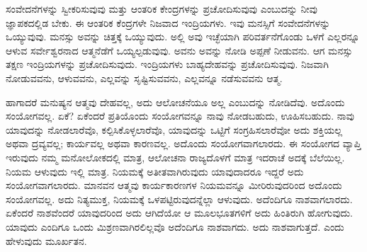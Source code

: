 ಸಂವೇದನೆಗಳನ್ನು ಸ್ವೀಕರಿಸುವುವು ಮತ್ತು ಆಂತರಿಕ ಕೇಂದ್ರಗಳನ್ನು ಪ್ರಚೋದಿಸುವುವು ಎಂಬುದನ್ನು ನೀವು ಜ್ಞಾಪಕದಲ್ಲಿಡ ಬೇಕು. ಈ ಆಂತರಿಕ ಕೆಂದ್ರಗಳೇ ನಿಜವಾದ ಇಂದ್ರಿಯಗಳು. ಇವು ಮನಸ್ಸಿಗೆ ಸಂವೇದನೆಗಳನ್ನು ಒಯ್ಯುವುವು. ಮನಸ್ಸು ಅವನ್ನು ಚಿತ್ತಕ್ಕೆ ಒಯ್ಯುವುದು. ಅಲ್ಲಿ ಅವು ಇಚ್ಛೆಯಾಗಿ ಪರಿವರ್ತನೆಗೊಂಡು ಒಳಗೆ ಎಲ್ಲರನ್ನೂ ಆಳುವ ಸರ್ವೇಶ್ವರನಾದ ಆತ್ಮನೆಡೆಗೆ ಒಯ್ಯಲ್ಪಡುವುವು. ಅವನು ಅವನ್ನು ನೋಡಿ ಅಪ್ಪಣೆ ನೀಡುವನು. ಆಗ ಮನಸ್ಸು ತಕ್ಷಣ ಇಂದ್ರಿಯಗಳನ್ನು ಪ್ರಚೋದಿಸುವುದು. ಇಂದ್ರಿಯಗಳು ಬಾಹ್ಯದೇಹವನ್ನು ಪ್ರಚೋದಿಸುವುವು. ನಿಜವಾಗಿ ನೋಡುವವನು, ಆಳುವವನು, ಎಲ್ಲವನ್ನು ಸೃಷ್ಟಿಸುವವನು, ಎಲ್ಲವನ್ನೂ ನಡೆಸುವವನು ಆತ್ಮ.

ಹಾಗಾದರೆ ಮನುಷ್ಯನ ಆತ್ಮವು ದೇಹವಲ್ಲ, ಅದು ಆಲೋಚನೆಯೂ ಅಲ್ಲ ಎಂಬುದನ್ನು ನೋಡಿದೆವು. ಅದೊಂದು ಸಂಯೋಗವಲ್ಲ. ಏಕೆ? ಏಕೆಂದರೆ ಪ್ರತಿಯೊಂದು ಸಂಯೋಗವನ್ನೂ ನಾವು ನೋಡಬಹುದು, ಊಹಿಸಬಹುದು. ನಾವು ಯಾವುದನ್ನು ನೋಡಲಾರೆವೊ, ಕಲ್ಪಿಸಿಕೊಳ್ಳಲಾರೆವೊ, ಯಾವುದನ್ನು ಒಟ್ಟಿಗೆ ಸಂಗ್ರಹಿಸಲಾರೆವೋ ಅದು ಶಕ್ತಿಯಲ್ಲ ಅಥವಾ ದ್ರವ್ಯವಲ್ಲ; ಕಾರ್ಯವಲ್ಲ ಅಥವಾ ಕಾರಣವಲ್ಲ. ಅದೊಂದು ಸಂಯೋಗವಾಗಲಾರದು. ಈ ಸಂಯೋಗದ ವ್ಯಾಪ್ತಿ ಇರುವುದು ನಮ್ಮ ಮನೋಲೋಕದಲ್ಲಿ ಮಾತ್ರ, ಆಲೋಚನಾ ರಾಜ್ಯದೊಳಗೆ ಮಾತ್ರ ಇದರಾಚೆ ಅದಕ್ಕೆ ಬೆಲೆಯಿಲ್ಲ. ನಿಯಮ ಆಳುವುದು ಇಲ್ಲಿ ಮಾತ್ರ. ನಿಯಮಕ್ಕೆ ಅತೀತವಾಗಿರುವುದು ಯಾವುದಾದರೂ ಇದ್ದರೆ ಅದು ಸಂಯೋಗವಾಗಲಾರದು. ಮಾನವನ ಆತ್ಮವು ಕಾರ್ಯಕಾರಣಗಳ ನಿಯಮವನ್ನೂ ಮೀರಿರುವುದರಿಂದ ಅದೊಂದು ಸಂಯೋಗವಲ್ಲ. ಅದು ನಿತ್ಯಮುಕ್ತ, ನಿಯಮಕ್ಕೆ ಒಳಪಟ್ಟಿರುವುದನ್ನೆಲ್ಲಾ ಆಳುವುದು. ಅದೆಂದಿಗೂ ನಾಶವಾಗಲಾರದು. ಏಕೆಂದರೆ ನಾಶವೆಂದರೆ ಯಾವುದರಿಂದ ಅದು ಆಗಿದೆಯೋ ಆ ಮೂಲಭೂತಗಳಿಗೆ ಅದು ಹಿಂತಿರುಗಿ ಹೋಗುವುದು. ಯಾವುದು ಎಂದಿಗೂ ಒಂದು ಮಿಶ್ರಣವಾಗಿರಲಿಲ್ಲವೊ ಅದೆಂದಿಗೂ ನಾಶವಾಗದು. ಅದು ನಾಶವಾಗುತ್ತದೆ. ಎಂದು ಹೇಳುವುದು ಮೂರ್ಖತನ.

